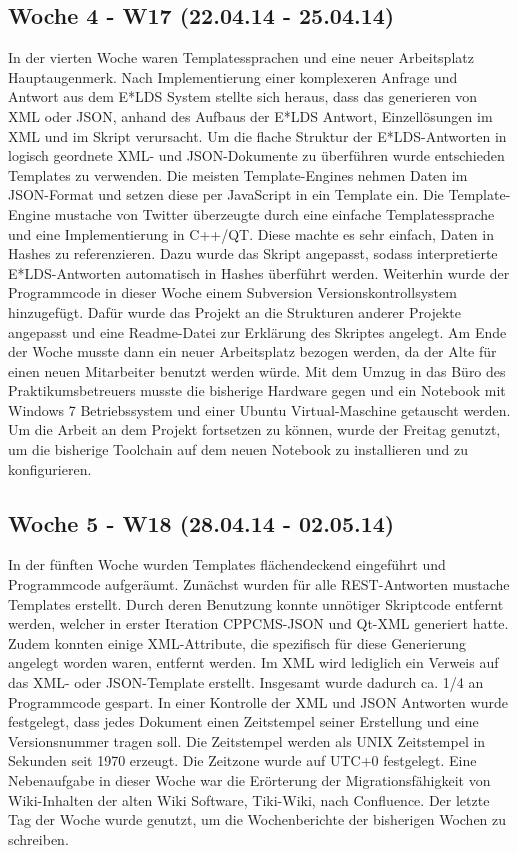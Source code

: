 \documentclass{article}
\begin{document}
\subsection{Woche 4 - W17 (22.04.14 - 25.04.14)}

In der vierten Woche waren Templatessprachen und eine neuer Arbeitsplatz Hauptaugenmerk. Nach Implementierung einer komplexeren Anfrage und Antwort aus dem E*LDS System stellte sich heraus, dass das generieren von XML oder JSON, anhand des Aufbaus der E*LDS Antwort, Einzellösungen im XML und im Skript verursacht. Um die flache Struktur der E*LDS-Antworten in logisch geordnete XML- und JSON-Dokumente zu überführen wurde entschieden Templates zu verwenden. Die meisten Template-Engines nehmen Daten im JSON-Format und setzen diese per JavaScript in ein Template ein. Die Template-Engine mustache von Twitter überzeugte durch eine einfache Templatessprache und eine Implementierung in C++/QT. Diese machte es sehr einfach, Daten in Hashes zu referenzieren. Dazu wurde das Skript angepasst, sodass interpretierte E*LDS-Antworten automatisch in Hashes überführt werden. Weiterhin wurde der Programmcode in dieser Woche einem Subversion Versionskontrollsystem hinzugefügt. Dafür wurde das Projekt an die Strukturen anderer Projekte angepasst und eine Readme-Datei zur Erklärung des Skriptes angelegt. Am Ende der Woche musste dann ein neuer Arbeitsplatz bezogen werden, da der Alte für einen neuen Mitarbeiter benutzt werden würde. Mit dem Umzug in das Büro des Praktikumsbetreuers musste die bisherige Hardware gegen und ein Notebook mit Windows 7 Betriebssystem und einer Ubuntu Virtual-Maschine getauscht werden. Um die Arbeit an dem Projekt fortsetzen zu können, wurde der Freitag genutzt, um die bisherige Toolchain auf dem neuen Notebook zu installieren und zu konfigurieren.

\subsection{Woche 5 - W18 (28.04.14 - 02.05.14)}

In der fünften Woche wurden Templates flächendeckend eingeführt und Programmcode aufgeräumt. Zunächst wurden für alle REST-Antworten mustache Templates erstellt. Durch deren Benutzung konnte unnötiger Skriptcode entfernt werden, welcher in erster Iteration CPPCMS-JSON und Qt-XML generiert hatte. Zudem konnten einige XML-Attribute, die spezifisch für diese Generierung angelegt worden waren, entfernt werden. Im XML wird lediglich ein Verweis auf das XML- oder JSON-Template erstellt. Insgesamt wurde dadurch ca. 1/4 an Programmcode gespart. In einer Kontrolle der XML und JSON Antworten wurde festgelegt, dass jedes Dokument einen Zeitstempel seiner Erstellung und eine Versionsnummer tragen soll. Die Zeitstempel werden als UNIX Zeitstempel in Sekunden seit 1970 erzeugt. Die Zeitzone wurde auf UTC+0 festgelegt. Eine Nebenaufgabe in dieser Woche war die Erörterung der Migrationsfähigkeit von Wiki-Inhalten der alten Wiki Software, Tiki-Wiki, nach Confluence. Der letzte Tag der Woche wurde genutzt, um die Wochenberichte der bisherigen Wochen zu schreiben.
\end{document}
